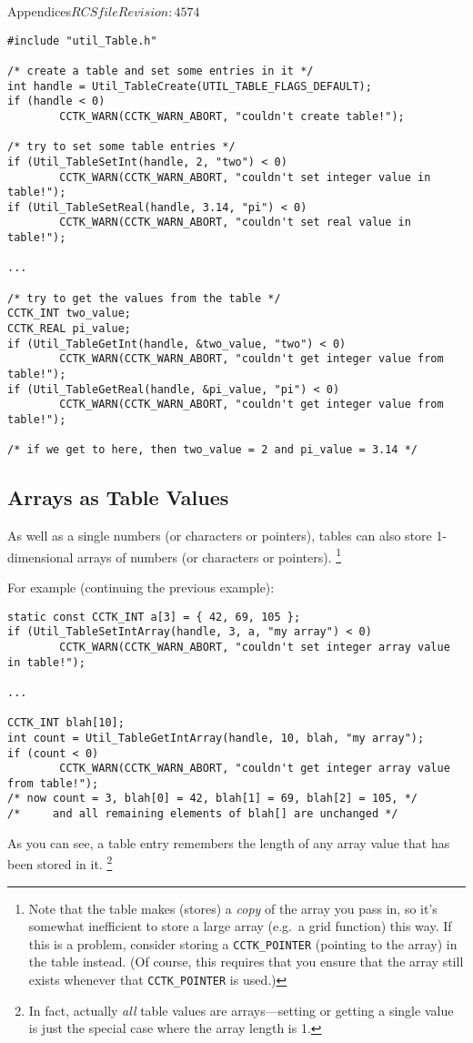 \begin{cactuspart}{Appendices}{$RCSfile$}{$Revision: 4574 $}
\begin{verbatim}
#include "util_Table.h"

/* create a table and set some entries in it */
int handle = Util_TableCreate(UTIL_TABLE_FLAGS_DEFAULT);
if (handle < 0)
        CCTK_WARN(CCTK_WARN_ABORT, "couldn't create table!");

/* try to set some table entries */
if (Util_TableSetInt(handle, 2, "two") < 0)
        CCTK_WARN(CCTK_WARN_ABORT, "couldn't set integer value in table!");
if (Util_TableSetReal(handle, 3.14, "pi") < 0)
        CCTK_WARN(CCTK_WARN_ABORT, "couldn't set real value in table!");

...

/* try to get the values from the table */
CCTK_INT two_value;
CCTK_REAL pi_value;
if (Util_TableGetInt(handle, &two_value, "two") < 0)
        CCTK_WARN(CCTK_WARN_ABORT, "couldn't get integer value from table!");
if (Util_TableGetReal(handle, &pi_value, "pi") < 0)
        CCTK_WARN(CCTK_WARN_ABORT, "couldn't get integer value from table!");

/* if we get to here, then two_value = 2 and pi_value = 3.14 */
\end{verbatim}


\subsection{Arrays as Table Values}

As well as a single numbers (or characters or pointers), tables can
also store 1-dimensional arrays of numbers (or characters or pointers).%
\footnote{%
	 Note that the table makes (stores) a \emph{copy} of the array
	 you pass in, so it's somewhat inefficient to store a large array
	 (e.g.~a grid function) this way.  If this is a problem, consider
	 storing a \texttt{CCTK\_POINTER} (pointing to the array) in the table
	 instead.  (Of course, this requires that you ensure that the array still exists whenever that \texttt{CCTK\_POINTER} is used.)
	 }%

For example (continuing the previous example):
\begin{verbatim}
static const CCTK_INT a[3] = { 42, 69, 105 };
if (Util_TableSetIntArray(handle, 3, a, "my array") < 0)
        CCTK_WARN(CCTK_WARN_ABORT, "couldn't set integer array value in table!");

...

CCTK_INT blah[10];
int count = Util_TableGetIntArray(handle, 10, blah, "my array");
if (count < 0)
        CCTK_WARN(CCTK_WARN_ABORT, "couldn't get integer array value from table!");
/* now count = 3, blah[0] = 42, blah[1] = 69, blah[2] = 105, */
/*     and all remaining elements of blah[] are unchanged */
\end{verbatim}
As you can see, a table entry remembers the length of any array
value that has been stored in it.%
\footnote{%
	 In fact, actually \emph{all} table values are
	 arrays---setting or getting a single value is
	 just the special case where the array length is 1.
	 }%
{}


\end{cactuspart}

